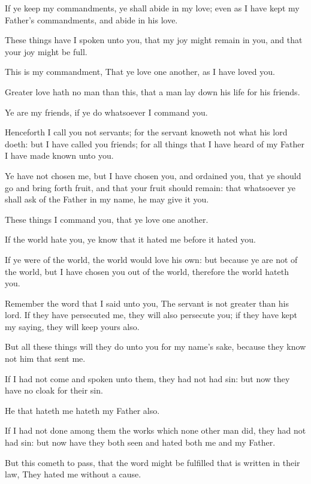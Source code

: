 \verse If ye keep my commandments, ye shall abide in my love; even as I have kept my Father's commandments, and abide in his love.

\verse These things have I spoken unto you, that my joy might remain in you, and that your joy might be full.

\verse This is my commandment, That ye love one another, as I have loved you.

\verse Greater love hath no man than this, that a man lay down his life for his friends.

\verse Ye are my friends, if ye do whatsoever I command you.

\verse Henceforth I call you not servants; for the servant knoweth not what his lord doeth: but I have called you friends; for all things that I have heard of my Father I have made known unto you.

\verse Ye have not chosen me, but I have chosen you, and ordained you, that ye should go and bring forth fruit, and that your fruit should remain: that whatsoever ye shall ask of the Father in my name, he may give it you.

\verse These things I command you, that ye love one another.

\verse If the world hate you, ye know that it hated me before it hated you.

\verse If ye were of the world, the world would love his own: but because ye are not of the world, but I have chosen you out of the world, therefore the world hateth you.

\verse Remember the word that I said unto you, The servant is not greater than his lord. If they have persecuted me, they will also persecute you; if they have kept my saying, they will keep yours also.

\verse But all these things will they do unto you for my name's sake, because they know not him that sent me.

\verse If I had not come and spoken unto them, they had not had sin: but now they have no cloak for their sin.

\verse He that hateth me hateth my Father also.

\verse If I had not done among them the works which none other man did, they had not had sin: but now have they both seen and hated both me and my Father.

\verse But this cometh to pass, that the word might be fulfilled that is written in their law, They hated me without a cause.

